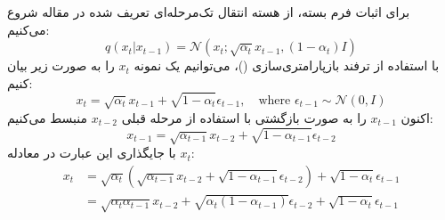 \begin{solutionbox}
    برای اثبات فرم بسته، از هسته انتقال تک‌مرحله‌ای تعریف شده در مقاله  شروع می‌کنیم:
    \begin{equation}
        q(x_t | x_{t-1}) = \mathcal{N}(x_t; \sqrt{\alpha_t} x_{t-1}, (1 - \alpha_t) I)
    \end{equation}
    با استفاده از ترفند بازپارامتری‌سازی ()، می‌توانیم یک نمونه $x_t$ را به صورت زیر بیان کنیم:
    \begin{equation}
        x_t = \sqrt{\alpha_t} x_{t-1} + \sqrt{1 - \alpha_t} \epsilon_{t-1}, \quad \text{where } \epsilon_{t-1} \sim \mathcal{N}(0, I)
    \end{equation}
    اکنون $x_{t-1}$ را به صورت بازگشتی با استفاده از مرحله قبلی $x_{t-2}$ منبسط می‌کنیم:
    \begin{equation}
        x_{t-1} = \sqrt{\alpha_{t-1}} x_{t-2} + \sqrt{1 - \alpha_{t-1}} \epsilon_{t-2}
    \end{equation}
    با جایگذاری این عبارت در معادله $x_t$:
    \begin{align*}
        x_t &= \sqrt{\alpha_t} (\sqrt{\alpha_{t-1}} x_{t-2} + \sqrt{1 - \alpha_{t-1}} \epsilon_{t-2}) + \sqrt{1 - \alpha_t} \epsilon_{t-1} \\
        &= \sqrt{\alpha_t \alpha_{t-1}} x_{t-2} + \sqrt{\alpha_t (1 - \alpha_{t-1})} \epsilon_{t-2} + \sqrt{1 - \alpha_t} \epsilon_{t-1}
    \end{align*}
    

\end{solutionbox}
